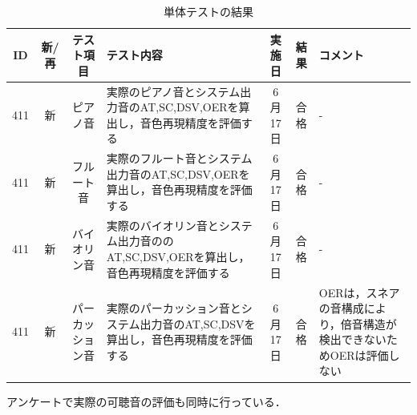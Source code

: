 \documentclass[uplatex,dvipdfmx]{jsarticle}
\begin{document}
\begin{table}[H]
\centering
   \caption{システムテストの結果}
   \label{システムテスト}
\end{table}



\begin{table}[H]
\centering
   \caption{単体テストの結果}
   \label{単体テスト}
\begin{tabular}{|c|c|c|p{5cm}|c|c|p{4cm}|} \hline
  ID&新/ 再&テスト項目 & テスト内容 & 実施日 & 結果 &コメント \\ \hline
  411&新&ピアノ音 & 実際のピアノ音とシステム出力音のAT,SC,DSV,OERを算出し，音色再現精度を評価する& 6月17日& 合格 & - \\\hline
  411&新&フルート音&実際のフルート音とシステム出力音のAT,SC,DSV,OERを算出し，音色再現精度を評価する& 6月17日 & 合格 & - \\ \hline
  411&新&バイオリン音&  実際のバイオリン音とシステム出力音ののAT,SC,DSV,OERを算出し，音色再現精度を評価する& 6月17日 & 合格 & - \\ \hline
  411&新& パーカッション音&実際のパーカッション音とシステム出力音のAT,SC,DSVを算出し，音色再現精度を評価する & 6月17日 &合格 & OERは，スネアの音構成により，倍音構造が検出できないためOERは評価しない \\ \hline
 \end{tabular}
\end{table}
アンケートで実際の可聴音の評価も同時に行っている．
\end{document}
